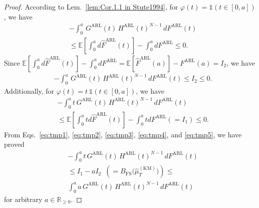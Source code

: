 \documentclass{article}
\theoremstyle{plain}
\theoremstyle{definition}
\theoremstyle{remark}
\def\nn{\nonumber \\ }
\def\mbr{\mathbb{R}}
\def\mbe{\mathbb{E}}
\def\mbone{\mathds{1}}
\begin{document}
\begin{proof}
    According to Lem.~\ref{lem:Cor.1.1 in Stute1994},
    for $\varphi(t) = \mbone(t \in [0,a])$, we have
    \begin{align}
        &-\int_0^a \,G^\mathrm{ARL}(t)\,{H^\mathrm{ARL}}(t)^{N-1}\,dF^\mathrm{ARL}(t) \nn
        &\leq
        \mbe[\int_0^a d\hat{F}^\mathrm{ARL}(t)] - \int_0^a dF^\mathrm{ARL}  
        \leq 0.
    \end{align}
    Since $\mbe[\int_0^a d\hat{F}^\mathrm{ARL}(t)] - \int_0^a dF^\mathrm{ARL} = \mbe[\hat{F}^\mathrm{ARL}(a)] - F^\mathrm{ARL}(a) = I_2$, we have
    \begin{align}
        &-\int_0^a \,G^\mathrm{ARL}(t)\,{H^\mathrm{ARL}}(t)^{N-1}\,dF^\mathrm{ARL}(t) \leq
        I_2 
        \leq  0. \label{eq:tmp4}
    \end{align}
    Additionally, for $\varphi(t) = t \,\mbone(t \in [0,a])$, we have
    \begin{align}
            &-\int_0^a t  \,G^\mathrm{ARL}(t)\,{H^\mathrm{ARL}}(t)^{N-1}\,dF^\mathrm{ARL}(t) \nn
            &\leq
            \mbe[\int_0^a t d\hat{F}^\mathrm{ARL}(t)] - \int_0^a t dF^\mathrm{ARL} (= I_1) 
            \leq 0. \label{eq:tmp5}
    \end{align}    
    From Eqs.~\eqref{eq:tmp1}, \eqref{eq:tmp2}, \eqref{eq:tmp3}, \eqref{eq:tmp4}, and \eqref{eq:tmp5}, we have proved
    \begin{align}
        &-\int_0^{a} t \,G^\mathrm{ARL}(t)\,{H^\mathrm{ARL}}(t)^{N-1}\,dF^\mathrm{ARL}(t) \nn
        &\leq
        I_1 -a I_2 
        \,\,\, (= B_{\mathrm{FS}}\!\bigl(\hat{\mu}_{T}^\mathrm{(KM)}\bigr)) 
        \leq \nn 
        &\int_0^{a} a\,G^\mathrm{ARL}(t)\,{H^\mathrm{ARL}}(t)^{N-1}\,dF^\mathrm{ARL}(t)
    \end{align}    
    for arbitrary $a \in \mbr_{\geq0}$.
\end{proof}
\end{document}
